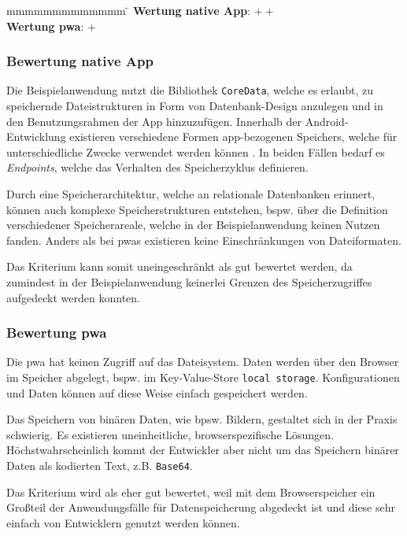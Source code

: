 \begin{tabbing}
	mmmmmmmmmmmmm				\= \kill
	\textbf{Wertung native App}: \> $++$\\
	\textbf{Wertung \ac{pwa}}: \> $+$
\end{tabbing}

\subsubsection{Bewertung native App}
Die Beispielanwendung nutzt die Bibliothek \texttt{CoreData}, welche es erlaubt, zu speichernde Dateistrukturen in Form von Datenbank-Design anzulegen und in den Benutzungsrahmen der App hinzuzufügen. Innerhalb der Android-Entwicklung existieren verschiedene Formen app-bezogenen Speichers, welche für unterschiedliche Zwecke verwendet werden können \cite{AndroidStorage}. In beiden Fällen bedarf es \textit{Endpoints}, welche das Verhalten des Speicherzyklus definieren.

Durch eine Speicherarchitektur, welche an relationale Datenbanken erinnert, können auch komplexe Speicherstrukturen entstehen, bspw. über die Definition verschiedener Speicherareale, welche in der Beispielanwendung keinen Nutzen fanden. Anders als bei \acp{pwa} existieren keine Einschränkungen von Dateiformaten.

Das Kriterium kann somit uneingeschränkt als gut bewertet werden, da zumindest in der Beispielanwendung keinerlei Grenzen des Speicherzugriffes aufgedeckt werden konnten.


\subsubsection{Bewertung \ac{pwa}}
Die \ac{pwa} hat keinen Zugriff auf das Dateisystem. Daten werden über den Browser im Speicher abgelegt, bspw. im Key-Value-Store \texttt{local storage}. Konfigurationen und Daten können auf diese Weise einfach gespeichert werden.

Das Speichern von binären Daten, wie  bpsw. Bildern, gestaltet sich in der Praxis schwierig. Es existieren uneinheitliche, browserspezifische Lösungen. Höchstwahrscheinlich kommt der Entwickler aber nicht um das Speichern binärer Daten als kodierten Text, z.B. \texttt{Base64}.

Das Kriterium wird als eher gut bewertet, weil mit dem Browserspeicher ein Großteil der Anwendungsfälle für Datenspeicherung abgedeckt ist und diese sehr einfach von Entwicklern genutzt werden können.